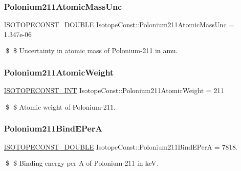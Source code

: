 \subsubsection{\texorpdfstring{Polonium211\+Atomic\+Mass\+Unc}{Polonium211AtomicMassUnc}}
{\footnotesize\ttfamily \mbox{\hyperlink{group___isotope_const-_macros_ga8f45a7272ce02c0b4c65c44636ed719a}{I\+S\+O\+T\+O\+P\+E\+C\+O\+N\+S\+T\+\_\+\+D\+O\+U\+B\+LE}} Isotope\+Const\+::\+Polonium211\+Atomic\+Mass\+Unc = 1.\+347e-\/06}

\$ \$ Uncertainty in atomic mass of Polonium-\/211 in amu. \mbox{\label{group___isotope_const-_polonium-_po211_gab8a205aaca71ec201f1cdd215d40de18}} 
\subsubsection{\texorpdfstring{Polonium211\+Atomic\+Weight}{Polonium211AtomicWeight}}
{\footnotesize\ttfamily \mbox{\hyperlink{group___isotope_const-_macros_ga5f18360b3e99483a35c32d789e62621c}{I\+S\+O\+T\+O\+P\+E\+C\+O\+N\+S\+T\+\_\+\+I\+NT}} Isotope\+Const\+::\+Polonium211\+Atomic\+Weight = 211}

\$ \$ Atomic weight of Polonium-\/211. \mbox{\label{group___isotope_const-_polonium-_po211_ga2560e2a6fec21dc55f43b821edeeba1f}} 
\subsubsection{\texorpdfstring{Polonium211\+Bind\+E\+PerA}{Polonium211BindEPerA}}
{\footnotesize\ttfamily \mbox{\hyperlink{group___isotope_const-_macros_ga8f45a7272ce02c0b4c65c44636ed719a}{I\+S\+O\+T\+O\+P\+E\+C\+O\+N\+S\+T\+\_\+\+D\+O\+U\+B\+LE}} Isotope\+Const\+::\+Polonium211\+Bind\+E\+PerA = 7818.}

\$ \$ Binding energy per A of Polonium-\/211 in keV. \mbox{\label{group___isotope_const-_polonium-_po211_gaec853f2aa63f9cb19bfeca63b33c9824}} 

